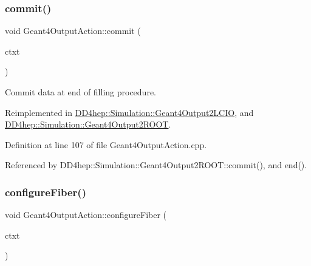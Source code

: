 \subsubsection{\texorpdfstring{commit()}{commit()}}
{\footnotesize\ttfamily void Geant4\+Output\+Action\+::commit (\begin{DoxyParamCaption}\item[{\hyperlink{class_d_d4hep_1_1_simulation_1_1_geant4_output_action_1_1_output_context}{Output\+Context}$<$ G4\+Event $>$ \&}]{ctxt }\end{DoxyParamCaption})\hspace{0.3cm}{\ttfamily [virtual]}}



Commit data at end of filling procedure. 



Reimplemented in \hyperlink{class_d_d4hep_1_1_simulation_1_1_geant4_output2_l_c_i_o_a86575064911453b387f237077fa8a969}{D\+D4hep\+::\+Simulation\+::\+Geant4\+Output2\+L\+C\+IO}, and \hyperlink{class_d_d4hep_1_1_simulation_1_1_geant4_output2_r_o_o_t_a06090a17c7d266dcdfb7b2b180aeaffe}{D\+D4hep\+::\+Simulation\+::\+Geant4\+Output2\+R\+O\+OT}.



Definition at line 107 of file Geant4\+Output\+Action.\+cpp.



Referenced by D\+D4hep\+::\+Simulation\+::\+Geant4\+Output2\+R\+O\+O\+T\+::commit(), and end().

\hypertarget{class_d_d4hep_1_1_simulation_1_1_geant4_output_action_abc1171027ea0a21fedef2d49a14ec557}{}\label{class_d_d4hep_1_1_simulation_1_1_geant4_output_action_abc1171027ea0a21fedef2d49a14ec557} 
\subsubsection{\texorpdfstring{configure\+Fiber()}{configureFiber()}}
{\footnotesize\ttfamily void Geant4\+Output\+Action\+::configure\+Fiber (\begin{DoxyParamCaption}\item[{\hyperlink{class_d_d4hep_1_1_simulation_1_1_geant4_context}{Geant4\+Context} $\ast$}]{ctxt }\end{DoxyParamCaption})\hspace{0.3cm}{\ttfamily [virtual]}}



